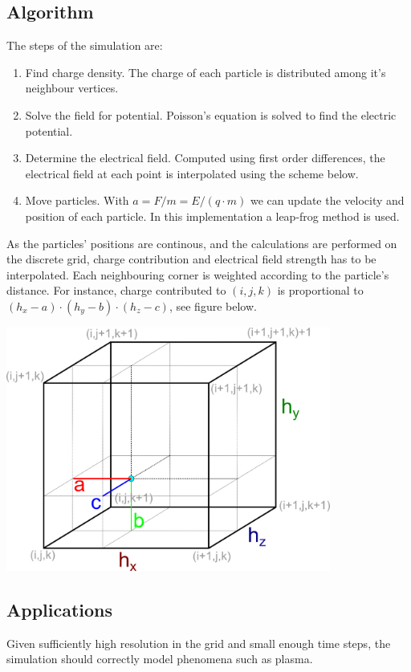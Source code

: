 \documentclass[10pt,a4paper,twocolumns]{article}
\newenvironment{Figure}
	{\par\medskip\noindent\minipage{\linewidth}}
	{\endminipage\par\medskip}
\begin{document}
\begin{multicols*}{2}
		\subsection*{Algorithm}
		The steps of the simulation are:
		\begin{enumerate}
		\item	Find charge density. The charge of each particle is
		distributed among it's neighbour vertices.
		\item	Solve the field for potential. Poisson's equation is solved
		to find the electric potential.
		\item	Determine the electrical field. Computed using first order
		differences, the electrical field at each point is interpolated
		using the scheme below.
		\item	Move particles. With $a=F/m=E/(q\cdot m)$ we can
		update the velocity	and position of each particle. In this
		 implementation a leap-frog method is used.
		\end{enumerate}
		
		As the particles' positions are continous, and the calculations
		are performed on the discrete grid, charge contribution and
		electrical field strength has to be interpolated. Each
		neighbouring corner is weighted according to the particle's
		distance. For instance, charge contributed to $(i,j,k)$ is
		proportional to $(h_x-a)\cdot (h_y-b)\cdot (h_z-c)$, see figure below.
		
		\begin{Figure}
			\center
			\includegraphics[width=0.8\textwidth]{grid.png}
			\label{fig:interpolation}
		\end{Figure}
		
		\subsection*{Applications}
		Given sufficiently high resolution in the grid and small
		enough time steps, the simulation should correctly model
		phenomena such as plasma.
		

\end{multicols*}
\end{document}
